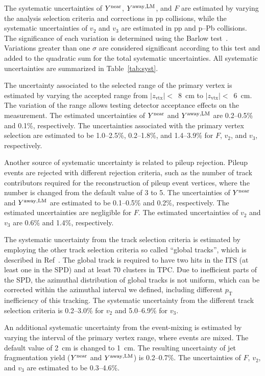 The systematic uncertainties of $Y^{\rm{near}}$, $Y^{\rm{away,LM}}$, and $F$ are estimated by varying the analysis selection criteria and corrections in pp collisions, while the systematic uncertainties of $v_{2}$ and $v_{3}$ are estimated in pp and p--Pb collisions.
The significance of each variation is determined using the Barlow test~\cite{Barlow:2002yb}. Variations greater than one $\sigma$ are considered significant according to this test and added to the quadratic sum for the total systematic uncertainties.
All systematic uncertainties are summarized in Table~\ref{tab:syst}. 

The uncertainty associated to the selected range of the primary vertex is estimated by varying the accepted range from $|z_\mathrm{vtx}|<$~8~cm to $|z_\mathrm{vtx}|<$~6~cm. The variation of the range allows testing detector acceptance effects on the measurement. The estimated uncertainties of $Y^{\rm{near}}$ and $Y^{\rm{away,LM}}$ are 0.2--0.5\% and 0.1\%, respectively. The uncertainties associated with the primary vertex selection are estimated to be 1.0--2.5\%, 0.2--1.8\%, and 1.4--3.9\% for $F$, $v_{2}$, and $v_{3}$, respectively. 

Another source of systematic uncertainty is related to pileup rejection. Pileup events are rejected with different rejection criteria, such as the number of track contributors required for the reconstruction of pileup event vertices, where the number is changed from the default value of 3 to 5. The uncertainties of $Y^{\rm{near}}$ and $Y^{\rm{away,LM}}$ are estimated to be 0.1--0.5\% and 0.2\%, respectively. The estimated uncertainties are negligible for $F$. The estimated uncertainties of $v_{2}$ and $v_{3}$ are 0.6\% and 1.4\%, respectively.

The systematic uncertainty from the track selection criteria is estimated by employing the other track selection criteria so called “global tracks”, which is described in Ref~\cite{ALICE:2021ptz}. The global track is required to have two hits in the ITS (at least one in the SPD) and at least 70 clusters in TPC. Due to inefficient parts of the SPD, the azimuthal distribution of global tracks is not uniform, which can be corrected within the azimuthal interval we defined, including different $p_{\mathrm{T}}$ inefficiency of this tracking. The systematic uncertainty from the different track selection criteria is  0.2--3.0\% for $v_{2}$ and  5.0--6.9\% for $v_{3}$. 


An additional systematic uncertainty from the event-mixing is estimated by varying the interval of the primary vertex range, where events are mixed. The default value of 2~cm is changed to 1~cm. The resulting uncertainty of jet fragmentation yield ($Y^{\rm{near}}$ and $Y^{\rm{away,LM}}$) is 0.2--0.7\%. The uncertainties of $F$, $v_{2}$, and $v_{3}$ are estimated to be 0.3--4.6\%.

